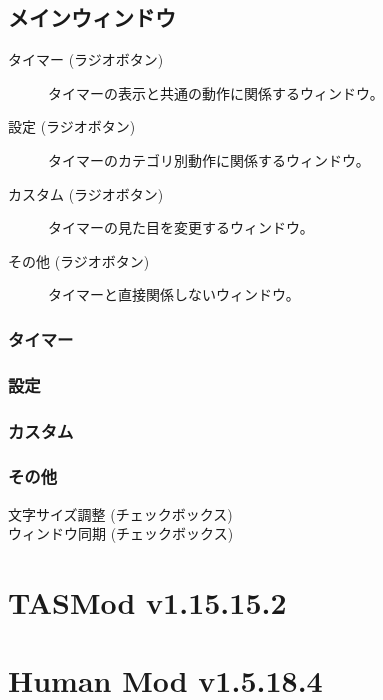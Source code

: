 \documentclass[lualatex,a4paper,fontsize=11pt,jafontscale=0.9247,titlepage,oneside]{jlreq}
\begin{document}
\subsection{メインウィンドウ}
\begin{description}
\item[タイマー (ラジオボタン)]タイマーの表示と共通の動作に関係するウィンドウ。
\item[設定 (ラジオボタン)]タイマーのカテゴリ別動作に関係するウィンドウ。
\item[カスタム (ラジオボタン)]タイマーの見た目を変更するウィンドウ。
\item[その他 (ラジオボタン)]タイマーと直接関係しないウィンドウ。
\end{description}
\subsubsection{タイマー}
\begin{description}
\item[]
\item[]
\end{description}
\subsubsection{設定}
\begin{description}
\item[]
\item[]
\end{description}
\subsubsection{カスタム}
\begin{description}
\item[]
\item[]
\end{description}
\subsubsection{その他}
\begin{description}
\item[文字サイズ調整 (チェックボックス)]
\item[ウィンドウ同期 (チェックボックス)]
\end{description}
\section{TASMod v1.15.15.2}
\section{Human Mod v1.5.18.4}
\end{document}
